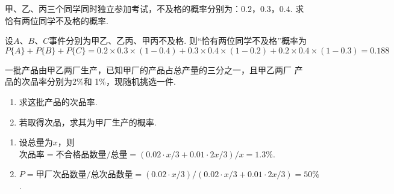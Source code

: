\begin{problem}
    甲、乙、丙三个同学同时独立参加考试，不及格的概率分别为：$0.2$，$0.3$，$0.4$. 求恰有两位同学不及格的概率.
\end{problem}
\begin{solution}
    设$A$、$B$、$C$事件分别为甲乙、乙丙、甲丙不及格. 则``恰有两位同学不及格''概率为
    \[P\{A\}+P\{B\}+P\{C\}=0.2\times0.3\times(1-0.4)+0.3\times0.4\times(1-0.2)+0.2\times0.4\times(1-0.3)=0.188\]
\end{solution}

\begin{problem}
    一批产品由甲乙两厂生产，已知甲厂的产品占总产量的三分之一，且甲乙两厂 产品的次品率分别为2\%和 1\%，现随机挑选一件.
    \begin{enumerate}
        \item 求这批产品的次品率.
        \item 若取得次品，求其为甲厂生产的概率.
    \end{enumerate}
\end{problem}
\begin{solution}\leavevmode
    \begin{enumerate}
        \item 设总量为$x$，则$\text{次品率}=\text{不合格品数量}/\text{总量}=(0.02\cdot x/3+0.01\cdot2x/3)/x=1.3\%$.
        \item $P=\text{甲厂次品数量}/\text{总次品数量}=(0.02\cdot x/3)/(0.02\cdot x/3+0.01\cdot2x/3)=50\%$.
    \end{enumerate}
\end{solution}

